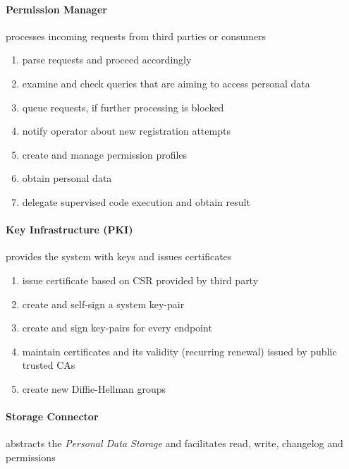 \documentclass[12pt,english,a4paper,titlepage,cleardoublepage=empty,dottedtoc]{report}
\providecommand{\tightlist}{%
  \setlength{\itemsep}{0pt}\setlength{\parskip}{0pt}}
\begin{document}
\paragraph{Permission Manager}\label{permission-manager}

processes incoming requests from third parties or consumers

\begin{enumerate}
\def\labelenumi{\alph{enumi})}
\tightlist
\item
  parse requests and proceed accordingly
\item
  examine and check queries that are aiming to access personal data
\item
  queue requests, if further processing is blocked
\item
  notify operator about new registration attempts
\item
  create and manage permission profiles
\item
  obtain personal data
\item
  delegate supervised code execution and obtain result
\end{enumerate}

\paragraph{Key Infrastructure (PKI)}\label{key-infrastructure-pki}

provides the system with keys and issues certificates

\begin{enumerate}
\def\labelenumi{\alph{enumi})}
\tightlist
\item
  issue certificate based on CSR provided by third party
\item
  create and self-sign a system key-pair
\item
  create and sign key-pairs for every endpoint
\item
  maintain certificates and its validity (recurring renewal) issued by
  public trusted CAs
\item
  create new Diffie-Hellman groups
\end{enumerate}

\paragraph{Storage Connector}\label{storage-connector}

abstracts the \emph{Personal Data Storage} and facilitates read, write,
changelog and permissions
\end{document}
